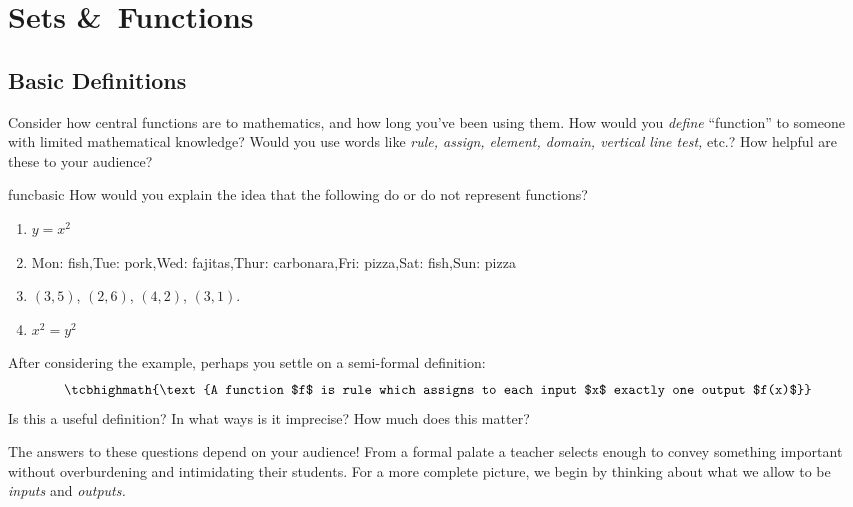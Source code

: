 \section{Sets \&\ Functions}\label{chap:func}

\subsection{Basic Definitions}\label{sec:funcdef}

Consider how central functions are to mathematics, and how long you've been using them. How would you \emph{define} ``function'' to someone with limited mathematical knowledge? Would you use words like \emph{rule, assign, element, domain, vertical line test,} etc.? How helpful are these to your audience?

\begin{examples}{}{funcbasic}
	How would you explain the idea that the following do or do not represent functions?\vspace{-5pt}
	\begin{enumerate}\itemsep0pt
	  \item $y=x^2$
	  \item\label{ex:funcbasic2} Mon: fish,\quad Tue: pork,\quad Wed: fajitas,\quad Thur: carbonara,\quad Fri: pizza,\quad Sat: fish,\quad Sun: pizza
	  \item $(3,5)$, $(2,6)$, $(4,2)$, $(3,1)$.
	  \item $x^2=y^2$
	\end{enumerate}
\end{examples}

After considering the example, perhaps you settle on a semi-formal definition:
\[
	\tcbhighmath{\text{A function $f$ is rule which assigns to each input $x$ exactly one output $f(x)$}}
\]
Is this a useful definition? In what ways is it imprecise? How much does this matter?
\medbreak

The answers to these questions depend on your audience! From a formal palate a teacher selects enough to convey something important without overburdening and intimidating their students. For a more complete picture, we begin by thinking about what we allow to be \emph{inputs} and \emph{outputs.}

